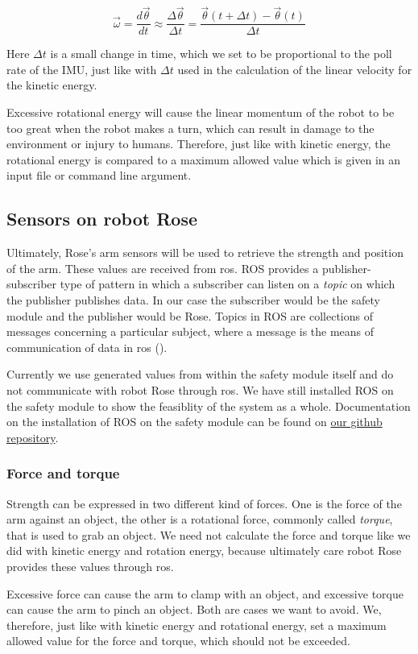 \documentclass[12pt]{scrreprt}
\begin{document}
\begin{equation}
    \vec{\omega} = \frac{d\vec{\theta}}{dt} \approx \frac{\Delta\vec{\theta}}{\Delta t} = \frac{\vec{\theta}(t + \Delta t ) - \vec{\theta}(t)}{\Delta t}
\end{equation}

Here $\Delta t$ is a small change in time, which we set to be proportional to the poll rate of the IMU, just like with $\Delta t$ used in the calculation of the linear velocity for the kinetic energy.
\par
Excessive rotational energy will cause the linear momentum of the robot to be too great when the robot makes a turn, which can result in damage to the environment or injury to humans. Therefore, just like with kinetic energy, the rotational energy is compared to a maximum allowed value which is given in an input file or command line argument.

\subsection{Sensors on robot Rose}
Ultimately, Rose's arm sensors will be used to retrieve the strength and position of the arm. These values are received from \acrshort{ros}. ROS provides a publisher-subscriber type of pattern in which a subscriber can listen on a \textit{topic} on which the publisher publishes data. In our case the subscriber would be the safety module and the publisher would be Rose. Topics in ROS are collections of messages concerning a particular subject, where a message is the means of communication of data in \acrshort{ros} (\cite{agitr}).
\par
Currently we use generated values from within the safety module itself and do not communicate with robot Rose through \acrshort{ros}. We have still installed ROS on the safety module to show the feasiblity of the system as a whole. Documentation on the installation of ROS on the safety module can be found on \href{https://github.com/Yousousen/safety-module-for-care-robot-rose.git}{our github repository}.
\subsubsection{Force and torque}
Strength can be expressed in two different kind of forces. One is the force of the arm against an object, the other is a rotational force, commonly called \textit{torque}, that is used to grab an object. We need not calculate the force and torque like we did with kinetic energy and rotation energy, because ultimately care robot Rose provides these values through \acrshort{ros}.
\par
Excessive force can cause the arm to clamp with an object, and excessive torque can cause the arm to pinch an object. Both are cases we want to avoid. We, therefore, just like with kinetic energy and rotational energy, set a maximum allowed value for the force and torque, which should not be exceeded.
\end{document}
